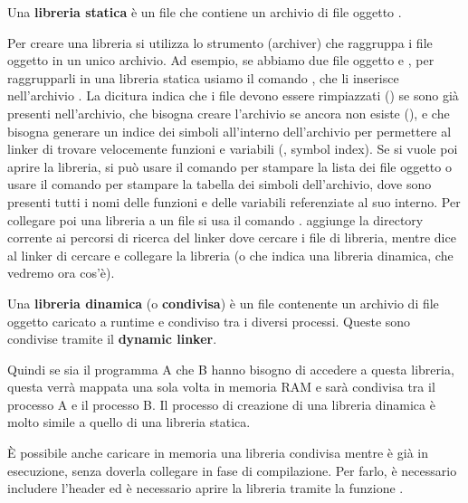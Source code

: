 \documentclass[11pt, a4paper, titlepage, oneside]{scrbook}
\begin{document}
\begin{Definizione}
\label{def-libreria-statica}
Una \textbf{libreria statica} è un file  che contiene un archivio di file oggetto . 
\end{Definizione}

Per creare una libreria si utilizza lo strumento  (archiver) che raggruppa i file oggetto in un unico archivio. Ad esempio, se abbiamo due file oggetto  e , per raggrupparli in una libreria statica usiamo il comando , che li inserisce nell'archivio . La dicitura  indica che i file devono essere rimpiazzati () se sono già presenti nell'archivio, che bisogna creare l'archivio se ancora non esiste (), e che bisogna generare un indice dei simboli all'interno dell'archivio per permettere al linker di trovare velocemente funzioni e variabili (, symbol index). Se si vuole poi aprire la libreria, si può usare il comando  per stampare la lista dei file oggetto o usare il comando  per stampare la tabella dei simboli dell'archivio, dove sono presenti tutti i nomi delle funzioni e delle variabili referenziate al suo interno. Per collegare poi una libreria a un file  si usa il comando .  aggiunge la directory corrente ai percorsi di ricerca del linker dove cercare i file di libreria, mentre  dice al linker di cercare e collegare la libreria  (o  che indica una libreria dinamica, che vedremo ora cos'è). 

\begin{Definizione}
\label{def-libreria-dinamica}
Una \textbf{libreria dinamica} (o \textbf{condivisa}) è un file  contenente un archivio di file oggetto  caricato a runtime e condiviso tra i diversi processi. Queste sono condivise tramite il \textbf{dynamic linker}.
\end{Definizione}
Quindi se sia il programma A che B hanno bisogno di accedere a questa libreria, questa verrà mappata una sola volta in memoria RAM e sarà condivisa tra il processo A e il processo B. Il processo di creazione di una libreria dinamica è molto simile a quello di una libreria statica.

È possibile anche caricare in memoria una libreria condivisa mentre è già in esecuzione, senza doverla collegare in fase di compilazione. Per farlo, è necessario includere l'header  ed è necessario aprire la libreria tramite la funzione .
\end{document}
